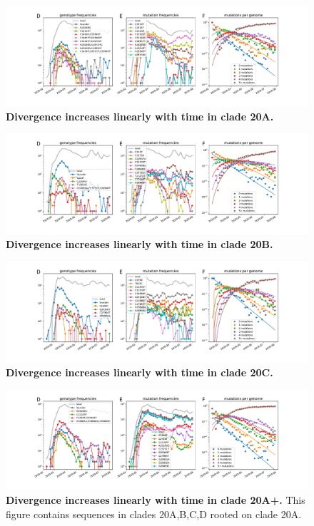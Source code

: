 \begin{figure}
    \includegraphics[width=\textwidth]{figures/counts/20A_counts.pdf}
    \caption{{\bf Divergence increases linearly with time in clade 20A.}
    \label{fig:20A_counts}}
\end{figure}

\begin{figure}
    \includegraphics[width=\textwidth]{figures/counts/20B_counts.pdf}
    \caption{{\bf Divergence increases linearly with time in clade 20B.}
    \label{fig:20B_counts}}
\end{figure}

\begin{figure}
    \includegraphics[width=\textwidth]{figures/counts/20C_counts.pdf}
    \caption{{\bf Divergence increases linearly with time in clade 20C.}
    \label{fig:20C_counts}}
\end{figure}


\begin{figure}
    \includegraphics[width=\textwidth]{figures/counts/20A+_counts.pdf}
    \caption{{\bf Divergence increases linearly with time in clade 20A+.}
    This figure contains sequences in clades 20A,B,C,D rooted on clade 20A.
    \label{fig:20A+_counts}}
\end{figure}



